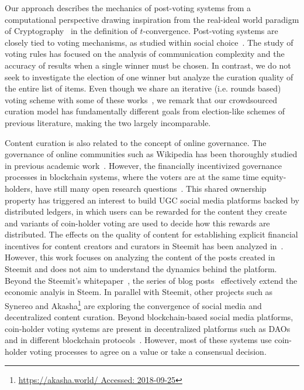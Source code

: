 Our approach describes the mechanics of post-voting systems from a computational perspective drawing inspiration from the real-ideal world paradigm of Cryptography~\cite{goldreich1999foundations,lindell} in the definition of $t$-convergence. 
Post-voting systems are closely tied to voting mechanisms, as studied within social choice~\cite{lu2011robust,conitzer2005communication,xia2010compilation}. The study of voting rules has focused on the analysis of communication complexity and the accuracy of results when a single winner must be chosen. In contrast, we do not seek to investigate the election of one winner but analyze the curation quality of the entire list of items. Even though we share an iterative (i.e. rounds based) voting scheme with some of these works~\cite{kalech2011practical}, we remark that our crowdsourced curation model has fundamentally different goals from election-like schemes of previous literature, making the two largely incomparable. 

Content curation is also related to the concept of online governance. The governance of online communities such as Wikipedia has been thoroughly studied in previous academic work~\cite{leskovec2010governance,forte2008scaling}. However, the financially incentivized governance processes in blockchain systems, where the voters are at the same time equity-holders, have still many open research questions~\cite{vitalik,ehrsam}. This shared ownership property has triggered an interest to build UGC social media platforms backed by distributed ledgers, in which users can be rewarded for the content they create and variants of coin-holder voting are used to decide how this rewards are distributed.
The effects on the quality of content for establishing explicit financial incentives for content creators and curators in Steemit has been analyzed in~\cite{thelwall2017can}.
However, this work focuses on analyzing the content of the posts created in Steemit and does not aim to understand the dynamics behind the platform. Beyond the Steemit's whitepaper~\cite{steemit}, the series of blog posts~\cite{curationRewards,selfvoters} effectively extend the economic analyis in Steem. In parallel with Steemit, other projects such as Synereo\cite{synereo} and Akasha\footnote{\url{https://akasha.world/ Accessed: 2018-09-25}} are exploring the convergence of social media and decentralized content curation.
Beyond blockchain-based social media platforms, coin-holder voting systems are present in decentralized platforms such as DAOs~\cite{darkdaos} and in different blockchain protocols~\cite{dash,tezos}. However, most of these systems use coin-holder voting processes to agree on a value or take a consensual decision.
